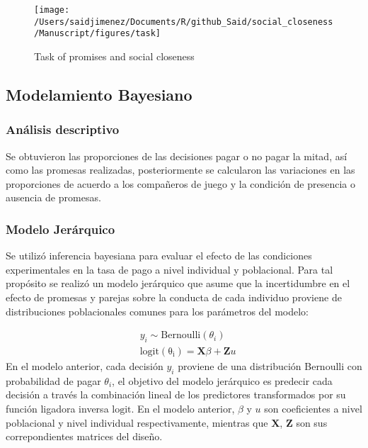 \documentclass[]{article}
\begin{document}
\begin{figure}

{\centering \texttt{[image: /Users/saidjimenez/Documents/R/github\_Said/social\_closeness/Manuscript/figures/task]} 

}

\caption{Task of promises and social closeness}\label{fig:figA}
\end{figure}

\subsection{Modelamiento Bayesiano}\label{modelamiento-bayesiano}

\subsubsection{Análisis descriptivo}\label{analisis-descriptivo}

Se obtuvieron las proporciones de las decisiones pagar o no pagar la
mitad, así como las promesas realizadas, posteriormente se calcularon
las variaciones en las proporciones de acuerdo a los compañeros de juego
y la condición de presencia o ausencia de promesas.

\subsubsection{Modelo Jerárquico}\label{modelo-jerarquico}

Se utilizó inferencia bayesiana para evaluar el efecto de las
condiciones experimentales en la tasa de pago a nivel individual y
poblacional. Para tal propósito se realizó un modelo jerárquico que
asume que la incertidumbre en el efecto de promesas y parejas sobre la
conducta de cada individuo proviene de distribuciones poblacionales
comunes para los parámetros del modelo:

\[
\begin{aligned}
&y_i \sim \mathrm{Bernoulli}(\theta_i) \\
&\mathrm{logit(\theta_i)} = \mathbf{X}\beta  +  \mathbf{Z}u
\end{aligned}
\] En el modelo anterior, cada decisión \(y_i\) proviene de una
distribución Bernoulli con probabilidad de pagar \(\theta_i\), el
objetivo del modelo jerárquico es predecir cada decisión a través la
combinación lineal de los predictores transformados por su función
ligadora inversa \(\mathrm{logit}\). En el modelo anterior, \(\beta\) y
\(u\) son coeficientes a nivel poblacional y nivel individual
respectivamente, mientras que \(\mathbf{X}\), \(\mathbf{Z}\) son sus
correpondientes matrices del diseño.
\end{document}
